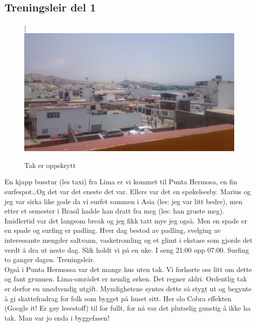 \subsection*{Treningsleir del 1}


\begin{figure}[!h]
	\centering
|\includegraphics[width=\textwidth]{takeroppskrytt}
	\caption{Tak er oppskrytt}
\label{fig:takeropskrytt}
\end{figure}
En kjapp busstur (les taxi) fra Lima er vi kommet til Punta Hermosa,
en fin surfespot\ldots Og det var det eneste det var. Ellers var det en
spøkelsesby. Marius og jeg var sirka like gode da vi
surfet sammen i Asia (les: jeg var litt bedre), men etter et semester i Brasil hadde han dratt
fra meg (les: han gruste meg). Imidlertid var det langsom break og jeg fikk tatt
mye jeg også. Men en spade er en spade og surfing er padling. Hver dag
bestod av padling,
svelging av interessante mengder saltvann, vasketromling og et glimt
i ekstase som gjorde det verdt å dra ut neste dag. Slik holdt vi på en
uke. I seng 21:00 opp 07:00. Surfing to ganger dagen. Treningsleir.\\



Også i Punta Hermossa var det mange hus uten tak. Vi forhørte oss litt
om dette og fant grunnen. Lima-området er nemlig ørken. Det regner
aldri. Ordentlig tak er derfor en unødvendig utgift. Myndighetene
syntes dette så stygt ut og begynte å gi skattefradrag for folk som
bygget på huset sitt. Her slo Cobra effekten (Google it!
Er gøy lesestoff) til for fullt, for nå var det plutselig gunstig å ikke
ha tak. Man var jo enda i byggefasen!


